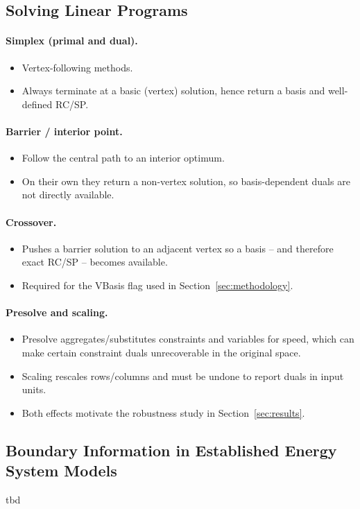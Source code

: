 \subsection{Solving Linear Programs}
\label{sec:solving-lps}

\paragraph{Simplex (primal and dual).}
\begin{itemize}
	\item Vertex-following methods.
	\item Always terminate at a basic (vertex) solution, hence return a basis
	and well-defined \ac{RC}/\ac{SP}.
\end{itemize}

\paragraph{Barrier / interior point.}
\begin{itemize}
	\item Follow the central path to an interior optimum.
	\item On their own they return a non-vertex solution, so basis-dependent
	duals are not directly available.
\end{itemize}

\paragraph{Crossover.}
\begin{itemize}
	\item Pushes a barrier solution to an adjacent vertex so a basis -- and
	therefore exact \ac{RC}/\ac{SP} -- becomes available.
	\item Required for the VBasis flag used in Section~\ref{sec:methodology}.
\end{itemize}

\paragraph{Presolve and scaling.}
\begin{itemize}
	\item Presolve aggregates/substitutes constraints and variables for speed,
	which can make certain constraint duals unrecoverable in the original space.
	\item Scaling rescales rows/columns and must be undone to report duals in
	input units.
	\item Both effects motivate the robustness study in Section~\ref{sec:results}.
\end{itemize}

\subsection{Boundary Information in Established Energy System Models}
\label{sec:related-work}
tbd
